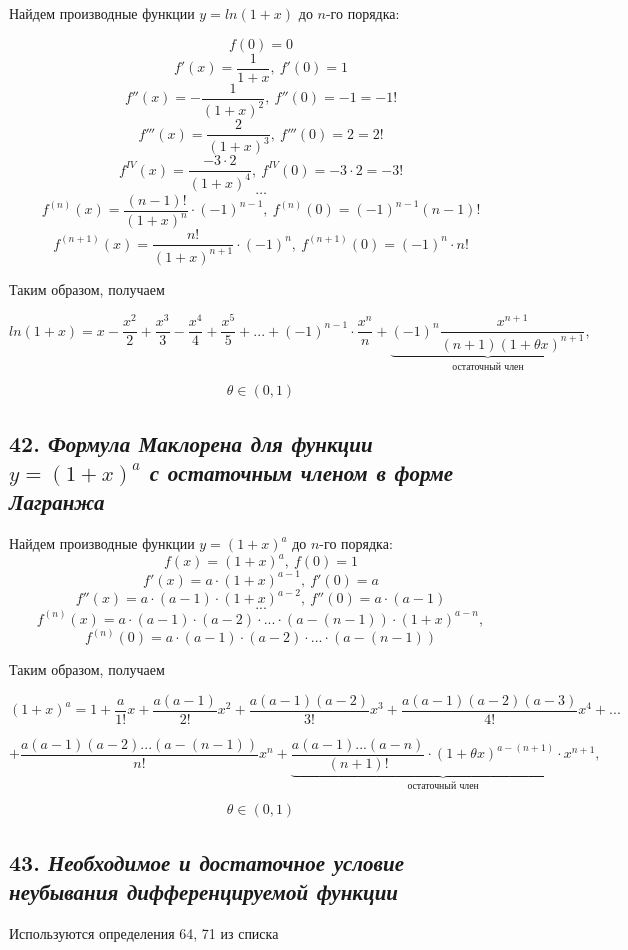 Найдем производные функции $y = ln(1+x)$ до $n$-го порядка:

$$f(0) = 0$$ $$f'(x) = \dfrac{1}{1+x}, \ f'(0) = 1$$ $$f''(x) = -\dfrac{1}{(1+x)^2}, \ f''(0) = -1 = -1!$$ $$f'''(x) = \dfrac{2}{(1+x)^3}, \ f'''(0) = 2 = 2!$$ $$f^{IV}(x) = \dfrac{-3\cdot 2}{(1+x)^4}, \ f^{IV}(0) = -3\cdot 2 = -3!$$ $$\dots$$ $$f^{(n)}(x) = \dfrac{(n - 1)!}{(1 + x)^n}\cdot (-1)^{n - 1}, \ f^{(n)}(0)=(-1)^{n-1}(n-1)! $$ $$f^{(n+1)}(x) = \dfrac{n!}{(1 + x)^{n+1}}\cdot (-1)^{n}, \ f^{(n+1)}(0)=(-1)^{n}\cdot n!$$

Таким образом, получаем
\begin{mainQuote}

$$ ln(1 + x) = x - \dfrac{x^2}{2}+ \dfrac{x^3}{3}- \dfrac{x^4}{4}+ \dfrac{x^5}{5} + ... + (-1)^{n - 1}\cdot \dfrac{x^n}{n} + \underbrace{(-1)^n\dfrac{x^{n+1}}{(n+1)(1 + \theta x)^{n+1}}}_{\text{остаточный \ член}}, $$

$$ \theta \in (0, 1)$$
\end{mainQuote}
\newpage 
\subsection*{42. \textit{Формула Маклорена для функции $y = (1 + x)^a$ с остаточным членом в форме Лагранжа}}

Найдем производные функции $y = (1 + x)^a$ до $n$-го порядка: $$f(x) = (1+x)^a , \ f(0) = 1$$ $$f'(x)=a \cdot (1+x)^{a - 1}, \ f'(0) = a$$ $$f''(x)=a \cdot (a - 1) \cdot (1+x)^{a - 2}, \ f''(0) = a\cdot (a - 1)$$ $$...$$ $$f^{(n)}(x) = a\cdot(a - 1)\cdot(a-2)\cdot...\cdot(a - (n - 1))\cdot (1+x)^{a-n},$$ $$ f^{(n)}(0) = a\cdot(a - 1)\cdot(a-2)\cdot...\cdot(a - (n - 1))$$

Таким образом, получаем
\begin{mainQuote}

$$ (1+x)^a = 1 + \dfrac{a}{1!}x + \dfrac{a(a-1)}{2!}x^2+ \dfrac{a(a-1)(a-2)}{3!}x^3+ \dfrac{a(a-1)(a-2)(a-3)}{4!}x^4+... $$

$$ +\dfrac{a(a-1)(a-2)...(a-(n-1))}{n!}x^n + \underbrace{\dfrac{a(a-1)...(a -n)}{(n+1)!}\cdot (1+\theta x)^{a-(n+1)}\cdot x^{n + 1}}_{\text{остаточный \ член}},$$

$$ \theta \in (0, 1)$$
\end{mainQuote}
\newpage 
\subsection*{43. \textit{Необходимое и достаточное условие неубывания дифференцируемой функции}}
\begin{Quote2} 
\small\centering 

Используются определения 64, 71 из списка \end{Quote2} 

